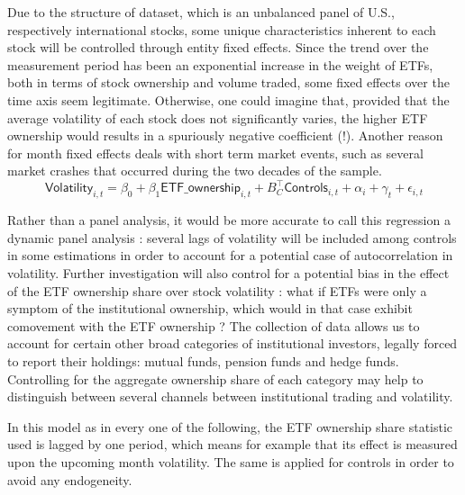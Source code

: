 Due to the structure of dataset, which is an unbalanced panel of U.S., respectively international stocks, some unique characteristics inherent to each stock will be controlled through entity fixed effects. Since the trend over the measurement period has been an exponential increase in the weight of ETFs, both in terms of stock ownership and volume traded, some fixed effects over the time axis seem legitimate. Otherwise, one could imagine that, provided that the average volatility of each stock does not significantly varies, the higher ETF ownership would results in a spuriously negative coefficient (!). Another reason for month fixed effects deals with short term market events, such as several market crashes that occurred during the two decades of the sample. 
\begin{equation}
  \mathsf{Volatility}_{i,t} = \beta_{0} + \beta_{1} \mathsf{ETF\_ownership}_{i, t} + B_{C}^{\intercal} \mathsf{Controls}_{i, t} + \alpha_{i} + \gamma_{t} + \epsilon_{i, t}
\end{equation}

Rather than a panel analysis, it would be more accurate to call this regression a dynamic panel analysis : several lags of volatility will be included among controls in some estimations in order to account for a potential case of autocorrelation in volatility. Further investigation will also control for a potential bias in the effect of the ETF ownership share over stock volatility : what if ETFs were only a symptom of the institutional ownership, which would in that case exhibit comovement with the ETF ownership ? The collection of data allows us to account for certain other broad categories of institutional investors, legally forced to report their holdings: mutual funds, pension funds and hedge funds. Controlling for the aggregate ownership share of each category may help to distinguish between several channels between institutional trading and volatility.

In this model as in every one of the following, the ETF ownership share statistic used is lagged by one period, which means for example that its effect is measured upon the upcoming month volatility. The same is applied for controls in order to avoid any endogeneity.
